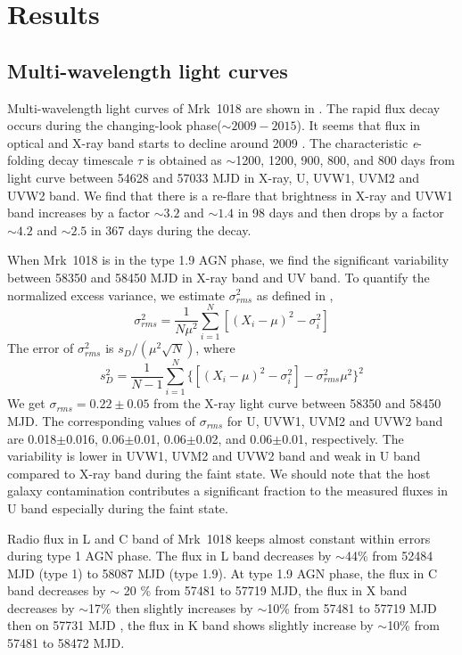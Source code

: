 \documentclass[twocolumn]{aastex63}
\begin{document}
\section{Results}
\label{sec:result}
\subsection{Multi-wavelength light curves}
\label{sec:multi-lc}

Multi-wavelength light curves of Mrk~1018 are shown in . The rapid flux decay occurs during the changing-look phase($\sim 2009-2015$). It seems that flux in optical and X-ray band starts to decline around 2009 \citep[see also the optical light curve in ][]{2016A&A...593L...8M}. The characteristic \textit{e}-folding decay timescale $\tau$ is obtained as $\sim$1200, 1200, 900, 800, and 800 days from light curve between 54628 and 57033 MJD in X-ray, U, UVW1, UVM2 and UVW2 band. We find that there is a re-flare that brightness in X-ray and UVW1 band increases by a factor $\sim3.2$ and $\sim1.4$ in 98 days and then drops by a factor $\sim4.2$ and $\sim2.5$ in 367 days during the decay. 

When Mrk~1018 is in the type 1.9 AGN phase, we find the significant variability between 58350 and 58450 MJD in X-ray band and UV band. To quantify the normalized excess variance, we estimate $\sigma^2_{rms} $ as defined in \citet{1999ApJ...524..667T},
\begin{equation}
\sigma^2_{rms}=\frac{1}{N\mu^2}\sum_{i=1}^{N}[(X_i-\mu)^2-\sigma_i^2]
\end{equation}
The error of $\sigma^2_{rms}$ is $s_D/(\mu^2\sqrt{N})$, where \begin{equation}
s_D^2=\frac{1}{N-1}\sum_{i=1}^{N}\{[(X_i-\mu)^2-\sigma_i^2]-\sigma^2_{rms}\mu^2\}^2
\end{equation}
We get $\sigma_{rms} = 0.22 \pm 0.05 $ from the X-ray light curve between 58350 and 58450 MJD. The corresponding values of $\sigma_{rms}$ for U, UVW1, UVM2 and UVW2 band are 0.018$\pm$0.016, 0.06$\pm$0.01, 0.06$\pm$0.02, and 0.06$\pm$0.01, respectively. The variability is lower in UVW1, UVM2 and UVW2 band and weak in U band compared to X-ray band during the faint state. We should note that the host galaxy contamination contributes a significant fraction to the measured fluxes in U band especially during the faint state. 


%


Radio flux in L and C band of Mrk~1018 keeps almost constant within errors during type 1 AGN phase. The flux in L band decreases by $\sim$44\% from 52484 MJD (type 1) to 58087 MJD (type 1.9). At type 1.9 AGN phase, the flux in C band decreases by $\sim$ 20 \% from 57481 to 57719 MJD, the flux in X band decreases by $\sim$17\% then slightly increases by $\sim$10\% from 57481 to 57719 MJD then on 57731 MJD , the flux in K band shows slightly increase by  $\sim$10\% from 57481 to 58472 MJD.
\end{document}
